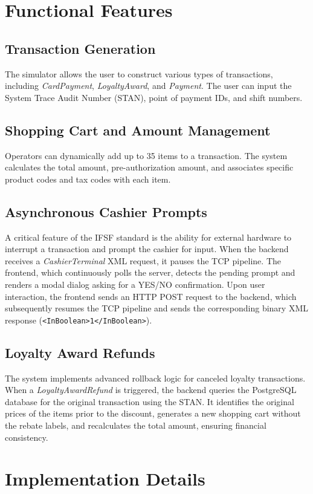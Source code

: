 \documentclass[12pt,a4paper]{report}
\begin{document}
\chapter{Functional Features}
\section{Transaction Generation}
The simulator allows the user to construct various types of transactions, including \textit{CardPayment}, \textit{LoyaltyAward}, and \textit{Payment}. The user can input the System Trace Audit Number (STAN), point of payment IDs, and shift numbers.

\section{Shopping Cart and Amount Management}
Operators can dynamically add up to 35 items to a transaction. The system calculates the total amount, pre-authorization amount, and associates specific product codes and tax codes with each item.

\section{Asynchronous Cashier Prompts}
A critical feature of the IFSF standard is the ability for external hardware to interrupt a transaction and prompt the cashier for input. When the backend receives a \textit{CashierTerminal} XML request, it pauses the TCP pipeline. The frontend, which continuously polls the server, detects the pending prompt and renders a modal dialog asking for a YES/NO confirmation. Upon user interaction, the frontend sends an HTTP POST request to the backend, which subsequently resumes the TCP pipeline and sends the corresponding binary XML response (\verb|<InBoolean>1</InBoolean>|).

\section{Loyalty Award Refunds}
The system implements advanced rollback logic for canceled loyalty transactions. When a \textit{LoyaltyAwardRefund} is triggered, the backend queries the PostgreSQL database for the original transaction using the STAN. It identifies the original prices of the items prior to the discount, generates a new shopping cart without the rebate labels, and recalculates the total amount, ensuring financial consistency.

\chapter{Implementation Details}
\end{document}
